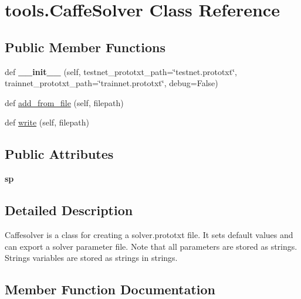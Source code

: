 \hypertarget{classtools_1_1_caffe_solver}{}\section{tools.\+Caffe\+Solver Class Reference}
\label{classtools_1_1_caffe_solver}
\subsection*{Public Member Functions}
\begin{DoxyCompactItemize}
\item 
\mbox{\label{classtools_1_1_caffe_solver_addf3361fddfe682affb3fd33ccaa0f53}} 
def {\bfseries \+\_\+\+\_\+init\+\_\+\+\_\+} (self, testnet\+\_\+prototxt\+\_\+path=\char`\"{}testnet.\+prototxt\char`\"{}, trainnet\+\_\+prototxt\+\_\+path=\char`\"{}trainnet.\+prototxt\char`\"{}, debug=False)
\item 
def \mbox{\hyperlink{classtools_1_1_caffe_solver_a3268e1dfe7af05cce13fef529353e99a}{add\+\_\+from\+\_\+file}} (self, filepath)
\item 
def \mbox{\hyperlink{classtools_1_1_caffe_solver_abad47d0b093c19b5ffa754f58cc62300}{write}} (self, filepath)
\end{DoxyCompactItemize}
\subsection*{Public Attributes}
\begin{DoxyCompactItemize}
\item 
\mbox{\label{classtools_1_1_caffe_solver_a3112fb8053036e924e9bae333428a455}} 
{\bfseries sp}
\end{DoxyCompactItemize}


\subsection{Detailed Description}
\begin{DoxyVerb}Caffesolver is a class for creating a solver.prototxt file. It sets default
values and can export a solver parameter file.
Note that all parameters are stored as strings. Strings variables are
stored as strings in strings.
\end{DoxyVerb}
 

\subsection{Member Function Documentation}
\mbox{\label{classtools_1_1_caffe_solver_a3268e1dfe7af05cce13fef529353e99a}} 
